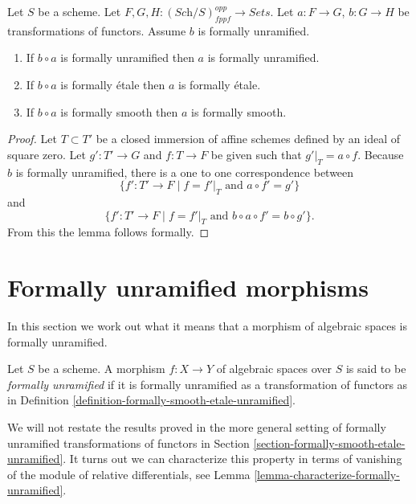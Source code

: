 \begin{lemma}
\label{lemma-formally-permanence}
Let $S$ be a scheme.
Let $F, G, H : (\textit{Sch}/S)_{fppf}^{opp} \to \textit{Sets}$.
Let $a : F \to G$, $b : G \to H$ be transformations of functors.
Assume $b$ is formally unramified.
\begin{enumerate}
\item If $b \circ a$ is formally unramified then $a$ is formally unramified.
\item If $b \circ a$ is formally \'etale then $a$ is formally \'etale.
\item If $b \circ a$ is formally smooth then $a$ is formally smooth.
\end{enumerate}
\end{lemma}

\begin{proof}
Let $T \subset T'$ be a closed immersion of affine schemes defined by an ideal
of square zero. Let $g' : T' \to G$ and $f : T \to F$ be given such that
$g'|_T = a \circ f$. Because $b$ is formally unramified, there is a one
to one correspondence between
$$
\{f' : T' \to F \mid f = f'|_T\text{ and }a \circ f' = g'\}
$$
and
$$
\{f' : T' \to F \mid f = f'|_T\text{ and }b \circ a \circ f' = b \circ g'\}.
$$
From this the lemma follows formally.
\end{proof}








\section{Formally unramified morphisms}
\label{section-formally-unramified}

\noindent
In this section we work out what it means that a morphism of algebraic spaces
is formally unramified.

\begin{definition}
\label{definition-formally-unramified}
Let $S$ be a scheme. A morphism $f : X \to Y$ of algebraic spaces over $S$
is said to be {\it formally unramified} if it is formally unramified as a
transformation of functors as in
Definition \ref{definition-formally-smooth-etale-unramified}.
\end{definition}

\noindent
We will not restate the results proved in the more general setting of
formally unramified transformations of functors in
Section \ref{section-formally-smooth-etale-unramified}.
It turns out we can characterize this property in terms of vanishing of the
module of relative differentials, see
Lemma \ref{lemma-characterize-formally-unramified}.

